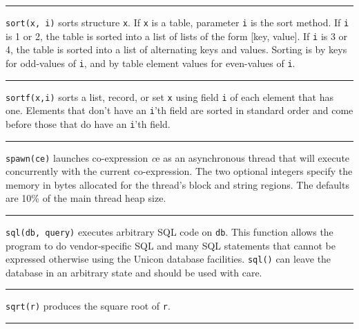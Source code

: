 \bigskip\hrule\vspace{0.1cm}

\noindent
{}\texttt{sort(x, i)} sorts structure \texttt{x}. If
\texttt{x} is a table, parameter \texttt{i} is the sort method. If
\texttt{i} is 1 or 2, the table is sorted into a list of lists of the
form [key, value]. If \texttt{i} is 3 or 4, the table is sorted into a
list of alternating keys and values. Sorting is by keys for odd-values
of \texttt{i}, and by table element values for even-values of
\texttt{i}.

\bigskip\hrule\vspace{0.1cm}

\noindent
{}\texttt{sortf(x,i)} sorts a list, record, or set
\texttt{x} using field \texttt{i} of each element that has one.
Elements that don't have an
\texttt{i}'th field are sorted in standard order and
come before those that do have an \texttt{i}'th field.

\bigskip\hrule\vspace{0.1cm}

\noindent
{}\texttt{spawn(ce)} launches co-expression {\textit ce} as an
asynchronous thread that will execute concurrently with the current
co-expression. The two optional integers specify the memory in bytes
allocated for the thread's block and string regions. The defaults are 10\%
of the main thread heap size.

\bigskip\hrule\vspace{0.1cm}

\noindent
{}\texttt{sql(db, query)} executes arbitrary SQL code on
\texttt{db}. This function allows the program to do vendor-specific SQL
and many SQL statements that cannot be expressed otherwise using the
Unicon database facilities. \texttt{sql()} can leave the database in an
arbitrary state and should be used with care.

\bigskip\hrule\vspace{0.1cm}

\noindent
{}\texttt{sqrt(r)} produces the square root of
\texttt{r}.

\bigskip\hrule\vspace{0.1cm}

